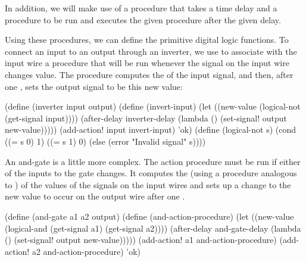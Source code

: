 \noindent
In addition, we will make use of a procedure  that takes a
time delay and a procedure to be run and executes the given procedure after the
given delay.

Using these procedures, we can define the primitive digital logic functions.
To connect an input to an output through an inverter, we use 
to associate with the input wire a procedure that will be run whenever the
signal on the input wire changes value.  The procedure computes the
 of the input signal, and then, after one
, sets the output signal to be this new value:

\begin{codeBlock}
(define (inverter input output)
  (define (invert-input)
    (let ((new-value (logical-not (get-signal input))))
      (after-delay
       inverter-delay
       (lambda () (set-signal! output new-value)))))
  (add-action! input invert-input) 'ok)
(define (logical-not s)
  (cond ((= s 0) 1)
        ((= s 1) 0)
        (else (error "Invalid signal" s))))
\end{codeBlock}

\noindent
An and-gate is a little more complex.  The action procedure must be run if
either of the inputs to the gate changes.  It computes the 
(using a procedure analogous to ) of the values of the
signals on the input wires and sets up a change to the new value to occur on
the output wire after one .

\begin{codeBlock}
(define (and-gate a1 a2 output)
  (define (and-action-procedure)
    (let
      ((new-value (logical-and
                      (get-signal a1)
                      (get-signal a2))))
      (after-delay
       and-gate-delay
       (lambda () (set-signal! output new-value)))))
  (add-action! a1 and-action-procedure)
  (add-action! a2 and-action-procedure)
  'ok)
\end{codeBlock}

